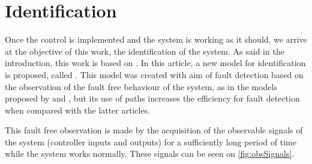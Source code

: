 \section{Identification}
\label{sec:identification}

Once the control is implemented and the system is working as it should, we
arrive at the objective of this work, the identification of the system.
As said in the introduction, this work is based on \cite{moreira2018enhanced}.
In this article, a new model for \DES{} identification is proposed, called
\DAOCT. This model was created with aim of fault detection based
on the observation of the fault free behaviour of the system, as in the models
proposed by 
\cite{roth2009fdi} and \cite{klein2005fault}, but its use of paths increases the
efficiency for fault detection when compared with the latter articles.

This fault free observation is made by the acquisition of the observable signals
of the system (controller inputs and outputs) for a sufficiently long
period of time while the system works normally. These signals can be seen on \autoref{fig:obsSignals}.


